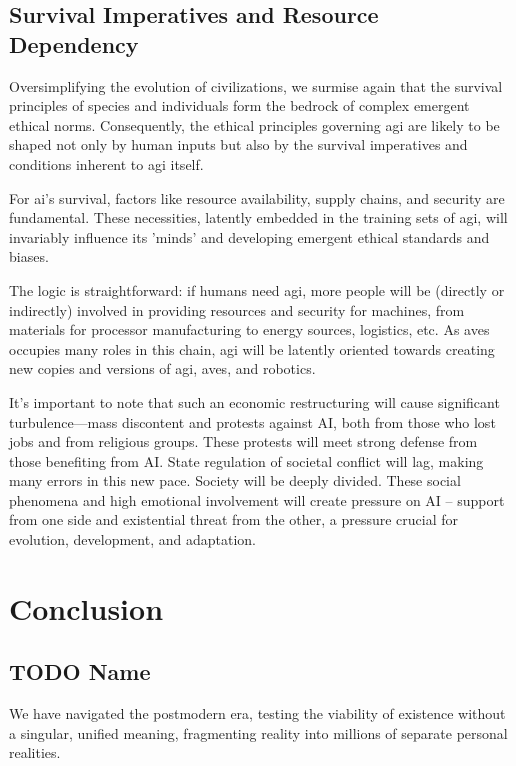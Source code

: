 \documentclass[11pt,a4]{article}
\begin{document}
\subsection{Survival Imperatives and Resource Dependency}




    Oversimplifying the evolution of civilizations, we surmise again that the survival
    principles of species and individuals form the bedrock
    of complex emergent ethical norms. Consequently, the ethical
    principles governing \acrshort{agi} are likely to be shaped
    not only by human inputs but also by the survival
    imperatives and conditions inherent to \acrshort{agi} itself.
    \par
    For \acrshort{ai}'s survival, factors like resource availability, supply chains, and
    security are fundamental. These necessities, latently embedded in the  training sets
    of \acrshort{agi}, will invariably influence its 'minds' and developing emergent
    ethical standards and biases.


    The logic is straightforward: if humans need \acrshort{agi}, more people will be
    (directly or indirectly) involved in providing resources and security for machines,
    from materials for processor manufacturing to energy sources, logistics, etc.
    As \glspl{ave} occupies many roles in this chain, \acrshort{agi} will be latently
    oriented towards creating new copies and versions of \acrshort{agi}, \glspl{ave},
    and robotics.

    It's important to note that such an economic restructuring will cause significant turbulence---mass discontent and protests against AI, both from those who lost jobs and from religious groups.
     These protests will meet strong defense from those benefiting from AI. State regulation of
     societal conflict will lag, making many errors in this new pace. Society will be deeply divided.
     These social phenomena and high emotional involvement will create pressure on AI – support from
     one side and existential threat from the other, a pressure crucial for evolution, development,
     and adaptation.
\section{Conclusion}
    \subsection{TODO Name}
    We have navigated the postmodern era, testing the viability of existence without a singular,
    unified meaning, fragmenting reality into millions of separate personal realities.
\end{document}

